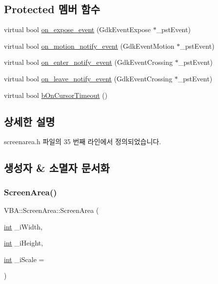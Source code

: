 \subsection*{Protected 멤버 함수}
\begin{DoxyCompactItemize}
\item 
virtual bool \mbox{\hyperlink{class_v_b_a_1_1_screen_area_ab800ac1ff230ac9cf33ac144e614160e}{on\+\_\+expose\+\_\+event}} (Gdk\+Event\+Expose $\ast$\+\_\+pst\+Event)
\item 
virtual bool \mbox{\hyperlink{class_v_b_a_1_1_screen_area_a3a341c2aa9a29f33e16923073b43e3e6}{on\+\_\+motion\+\_\+notify\+\_\+event}} (Gdk\+Event\+Motion $\ast$\+\_\+pst\+Event)
\item 
virtual bool \mbox{\hyperlink{class_v_b_a_1_1_screen_area_aa0bb4110528b060c4fb9a01ad868e4b5}{on\+\_\+enter\+\_\+notify\+\_\+event}} (Gdk\+Event\+Crossing $\ast$\+\_\+pst\+Event)
\item 
virtual bool \mbox{\hyperlink{class_v_b_a_1_1_screen_area_a15325a7cba813d00e8b2638a6abf651f}{on\+\_\+leave\+\_\+notify\+\_\+event}} (Gdk\+Event\+Crossing $\ast$\+\_\+pst\+Event)
\item 
virtual bool \mbox{\hyperlink{class_v_b_a_1_1_screen_area_a27266c7186e0d854759430c400d3e48a}{b\+On\+Cursor\+Timeout}} ()
\end{DoxyCompactItemize}


\subsection{상세한 설명}


screenarea.\+h 파일의 35 번째 라인에서 정의되었습니다.



\subsection{생성자 \& 소멸자 문서화}
\mbox{\label{class_v_b_a_1_1_screen_area_a5bc7bd5f6077d82a7affa8527d3112c9}} 
\subsubsection{\texorpdfstring{Screen\+Area()}{ScreenArea()}}
{\footnotesize\ttfamily V\+B\+A\+::\+Screen\+Area\+::\+Screen\+Area (\begin{DoxyParamCaption}\item[{\mbox{\hyperlink{_util_8cpp_a0ef32aa8672df19503a49fab2d0c8071}{int}}}]{\+\_\+i\+Width,  }\item[{\mbox{\hyperlink{_util_8cpp_a0ef32aa8672df19503a49fab2d0c8071}{int}}}]{\+\_\+i\+Height,  }\item[{\mbox{\hyperlink{_util_8cpp_a0ef32aa8672df19503a49fab2d0c8071}{int}}}]{\+\_\+i\+Scale = {} }\end{DoxyParamCaption})}



